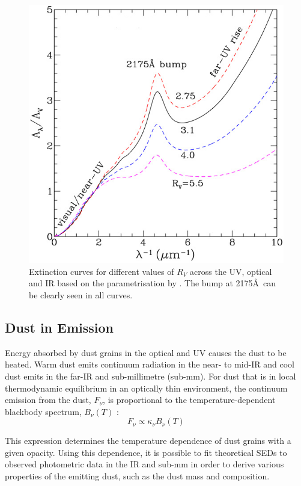 \begin{figure}
\centering
\includegraphics[clip=true,scale=1,trim= 0 0 0 0]{chapters/chapter1/figs/extinction_curves.png}
\caption{Extinction curves for different values of $R_V$ across the UV, optical and IR based on the parametrisation by \citet{Cardelli1989} .  The bump at 2175\AA\ can be clearly seen in all curves.}
\label{fig:ext_curve}
\end{figure}

\subsection{Dust in Emission}

Energy absorbed by dust grains in the optical and UV causes the dust to be heated.  Warm dust emits continuum radiation in the near- to mid-IR and cool dust emits in the far-IR and sub-millimetre (sub-mm).  For dust that is in local thermodynamic equilibrium in an optically thin environment, the continuum emission from the dust, $F_{\nu}$,  is proportional to the temperature-dependent blackbody spectrum, $B_{\nu}(T)$ \citep{Hildebrand1983}:
\begin{equation}
F_{\nu}\propto \kappa_{\nu} B_{\nu}(T)
\end{equation}

This expression determines the temperature dependence of dust grains with a given opacity. Using this dependence, it is possible to fit theoretical SEDs to  observed photometric data in the IR and sub-mm in order to derive various properties of the emitting dust, such as the dust mass and composition.  

